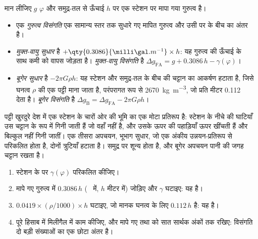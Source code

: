 \begin{definition}[गुरुत्व विसंगतियाँ]\label{def:b1:isostasy-gravity:anomalies}
मान लीजिए $g$  $\varphi$ और समुद्र-तल से ऊँचाई $h$ पर एक स्टेशन पर मापा गया गुरुत्व है।
\begin{itemize}
  \item एक \emph{गुरुत्व विसंगति} एक सामान्य स्तर तक सुधारे गए मापित गुरुत्व और उसी  पर  के बीच का अंतर है।
  \item \emph{मुक्त-वायु सुधार} है $+\qty{0.3086}{\milli\gal.m^{-1}}\times h$: यह गुरुत्व की ऊँचाई के साथ कमी को वापस जोड़ता है। \emph{मुक्त-वायु विसंगति} है $\Delta g_{\mathrm{FA}} = g + 0.3086\,h - \gamma(\varphi)$।
  \item \emph{बूगेर सुधार} है $-2\pi G\rho h$: यह स्टेशन और समुद्र-तल के बीच की चट्टान का आकर्षण हटाता है, जिसे घनत्व $\rho$ की एक पट्टी माना जाता है, परंपरागत रूप से \qty{2670}{kg.m^{-3}}, जो प्रति मीटर \qty{0.112}{\milli\gal} देता है। \emph{बूगेर विसंगति} है $\Delta g_{\mathrm B} = \Delta g_{\mathrm{FA}} - 2\pi G\rho h$।
\end{itemize}
\end{definition}

पट्टी खुरदुरे देश में एक स्टेशन के चारों ओर की भूमि का एक मोटा प्रतिरूप है: स्टेशन के नीचे की घाटियाँ उस चट्टान के रूप में गिनी जाती हैं जो वहाँ नहीं है, और उसके ऊपर की पहाड़ियाँ ऊपर खींचती हैं और बिल्कुल नहीं गिनी जातीं। एक तीसरा अपचयन, भूभाग सुधार, जो एक अंकीय उन्नयन-प्रतिरूप से परिकलित होता है, दोनों त्रुटियाँ हटाता है। समुद्र पर  शून्य होता है, और बूगेर अपचयन पानी की जगह चट्टान रखता है।

\begin{method}[गुरुत्व-पाठ का अपचयन]\label{met:b1:isostasy-gravity:reduction}
\begin{enumerate}
  \item स्टेशन के  पर  $\gamma(\varphi)$ परिकलित कीजिए।
  \item मापे गए गुरुत्व में  $0.3086\,h$ (\unit{\milli\gal} में, $h$ मीटर में) जोड़िए और $\gamma$ घटाइए: यह  है।
  \item {} $0.0419\times(\rho/1000)\times h$ घटाइए, जो मानक घनत्व के लिए $0.112\,h$ है: यह  है।
  \item पूरे हिसाब में मिलीगैल में काम कीजिए, और मापे गए तथा  को सात सार्थक अंकों तक रखिए: विसंगति दो बड़ी संख्याओं का एक छोटा अंतर है।
\end{enumerate}
\end{method}

